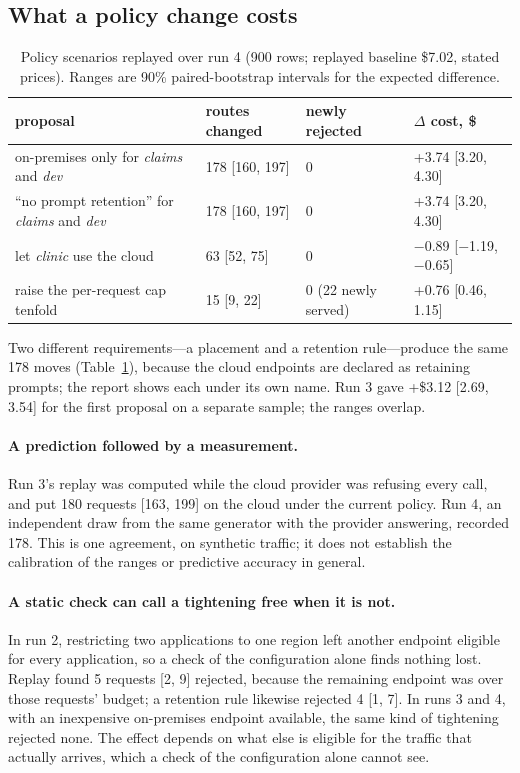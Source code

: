 \documentclass[11pt]{article}
\begin{document}
\subsection{What a policy change costs}

\begin{table}[t]
\centering
\small
\caption{Policy scenarios replayed over run 4 (900 rows; replayed baseline \$7.02, stated
prices). Ranges are 90\% paired-bootstrap intervals for the expected difference.}
\label{tab:scenarios}
\begin{tabular}{@{}p{6.2cm}lll@{}}
\toprule
proposal & routes changed & newly rejected & $\Delta$ cost, \$ \\
\midrule
on-premises only for \emph{claims} and \emph{dev} & 178 [160, 197] & 0 & +3.74 [3.20, 4.30] \\
``no prompt retention'' for \emph{claims} and \emph{dev} & 178 [160, 197] & 0 & +3.74 [3.20, 4.30] \\
let \emph{clinic} use the cloud & 63 [52, 75] & 0 & $-$0.89 [$-$1.19, $-$0.65] \\
raise the per-request cap tenfold & 15 [9, 22] & 0 (22 newly served) & +0.76 [0.46, 1.15] \\
\bottomrule
\end{tabular}
\end{table}

Two different requirements---a placement and a retention rule---produce the same 178 moves
(Table~\ref{tab:scenarios}), because the cloud endpoints are declared as retaining prompts; the
report shows each under its own name. Run 3 gave +\$3.12 [2.69, 3.54] for the first proposal on
a separate sample; the ranges overlap.

\paragraph{A prediction followed by a measurement.} Run 3's replay was computed while the cloud
provider was refusing every call, and put 180 requests [163, 199] on the cloud under the current
policy. Run 4, an independent draw from the same generator with the provider answering, recorded
178. This is one agreement, on synthetic traffic; it does not establish the calibration of the
ranges or predictive accuracy in general.

\paragraph{A static check can call a tightening free when it is not.} In run 2, restricting two
applications to one region left another endpoint eligible for every application, so a check of
the configuration alone finds nothing lost. Replay found 5 requests [2, 9] rejected, because the
remaining endpoint was over those requests' budget; a retention rule likewise rejected 4 [1, 7].
In runs 3 and 4, with an inexpensive on-premises endpoint available, the same kind of tightening
rejected none. The effect depends on what else is eligible for the traffic that actually
arrives, which a check of the configuration alone cannot see.
\end{document}
